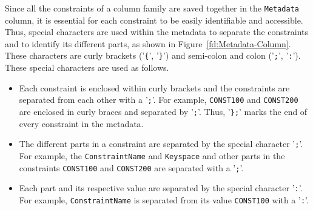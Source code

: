 Since all the  constraints of a column family are saved together in the
\texttt{Metadata} column,  it is essential for each constraint to be easily
identifiable and accessible.  Thus, special characters are used within the
metadata to separate the constraints and to identify its different parts, as
shown in Figure~\ref{fd:Metadata-Column}. These characters are curly brackets
('\texttt{\{}', '\texttt{\}}') and semi-colon and colon ('\texttt{;}',
'\texttt{:}'). These special characters are used as follows.



% 


	
		\begin{itemize}
			\item Each constraint is enclosed within curly brackets and the
			constraints are separated from each other with a
			'\texttt{;}'.  For example,  \texttt{CONST100} and \texttt{CONST200} are
			enclosed in curly braces and separated by '\texttt{;}'. 
			Thus,  '\texttt{\};}' marks the end of every constraint in the metadata. 
		
		
			\item The different parts in a constraint are separated by the special character
			'\texttt{;}'.  For example,  the \texttt{ConstraintName} and \texttt{Keyspace}
			and other parts in the constraints \texttt{CONST100} and \texttt{CONST200} are
			separated with a '\texttt{;}'.
			 
			 
			\item Each part and its respective value are separated by the special
			character '\texttt{:}'.  For example,  \texttt{ConstraintName} is separated from
			its value \texttt{CONST100} with a '\texttt{:}'.  
			
		\end{itemize}


